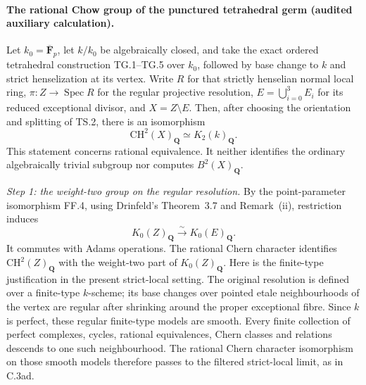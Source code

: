 \paragraph{The rational Chow group of the punctured tetrahedral germ
(audited auxiliary calculation).}
Let $k_0=\overline{\mathbf F}_p$, let $k/k_0$ be algebraically closed,
and take the exact ordered tetrahedral construction TG.1--TG.5 over
$k_0$, followed by base change to $k$ and strict henselization at its
vertex.  Write $R$ for that strictly henselian normal local ring,
$\pi:Z\to\operatorname{Spec}R$ for the regular projective resolution,
$E=\bigcup_{i=0}^3E_i$ for its reduced exceptional divisor, and
$X=Z\setminus E$.  Then, after choosing the orientation and splitting
of TS.2, there is an isomorphism
\begin{equation}
                 \mathrm{CH}^{2}(X)_{\mathbf Q}
                       \simeq K_2(k)_{\mathbf Q}.
                 \tag{TC.1}
\end{equation}
This statement concerns rational equivalence.  It neither identifies
the ordinary algebraically trivial subgroup nor computes
$B^2(X)_{\mathbf Q}$.

\emph{Step 1: the weight-two group on the regular resolution.}
By the point-parameter isomorphism FF.4, using Drinfeld's
Theorem~3.7 and Remark~(ii)\citep[author p.~8]{frDrinfeld2004Tate},
restriction induces
\[
                     K_0(Z)_{\mathbf Q}
                            \xrightarrow{\sim}K_0(E)_{\mathbf Q}.
\]
It commutes with Adams operations.  The rational Chern character
identifies $\mathrm{CH}^{2}(Z)_{\mathbf Q}$ with the weight-two
part of $K_0(Z)_{\mathbf Q}$.  Here is the finite-type justification
in the present strict-local setting.  The original resolution is
defined over a finite-type $k$-scheme; its base changes over pointed
etale neighbourhoods of the vertex are regular after shrinking
around the proper exceptional fibre.  Since $k$ is perfect, these
regular finite-type models are smooth.  Every finite collection of
perfect complexes, cycles, rational equivalences, Chern classes and
relations descends to one such neighbourhood.  The rational Chern
character isomorphism on those smooth models
\citep[Example~15.2.16, pp.~294--295]{frC4Fulton1998}
therefore passes to the filtered strict-local limit, as in C.3ad.


